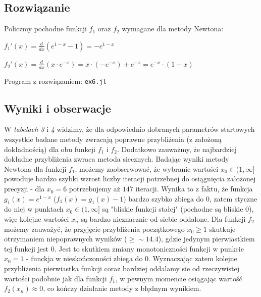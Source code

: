\documentclass[11pt]{article}
\begin{document}
    \subsection*{Rozwiązanie}
        Policzmy pochodne funkcji $f_1$ oraz $f_2$ wymagane dla metody Newtona:
        \begin{center}
        \begin{math}
            f_1'(x) = \frac{d}{dx}(e^{1 - x} - 1) = -e^{1 - x}
        \end{math}
        \end{center}
        \noindent
        \begin{center}
        \begin{math}
            f_2'(x) = \frac{d}{dx}(x \cdot e^{-x}) = x \cdot (-e^{-x}) + e^{-x} = e^{-x} \cdot (1 - x)
        \end{math}
        \end{center}
        \noindent\newline
        Program z rozwiązaniem: \texttt{ex6.jl}
        
    \subsection*{Wyniki i obserwacje}
        W \textit{tabelach 3} i  \textit{4} widzimy, że dla odpowiednio dobranych parametrów startowych wszystkie badane
        metody zwracają poprawne przybliżenia (z założoną dokładnością) dla obu funkcji $f_1$ i $f_2$. Dodatkowo zauważmy,
        że najbardziej dokładne przybliżenia zwraca metoda siecznych.
        \newline\newline
        Badając wyniki metody Newtona dla funkcji $f_1$, możemy zaobserwować, że wybranie wartości 
        $x_0 \in (1, \infty]$ powoduje bardzo szybki wzrost liczby iteracji potrzebnej do osiągnięcia
        założonej precyzji - dla $x_0 = 6$ potrzebujemy aż $147$ iteracji. Wynika to z faktu, że funkcja $g_1(x) = e^{1 - x}$ 
        ($f_1(x) = g_1(x) - 1$) bardzo szybko zbiega do $0$, zatem styczne do niej w punktach $x_0 \in (1, \infty]$ są 
        "bliskie funkcji stałej" (pochodne są bliskie $0$), więc kolejne wartości $x_n$ są bardzo nieznacznie od siebie oddalone.
        \newline
        Dla funkcji $f_2$ możemy zauważyć, że przyjęcie przybliżenia początkowego $x_0 \geq 1$ skutkuje otrzymaniem 
        niepoprawnych wyników ($\geq \sim 14.4$), gdzie jedynym pierwiastkiem tej funkcji jest $0$. Jest to skutkiem
        zmiany monotoniczności funkcji w punkcie $x_0 = 1$ - funckja w nieskończoności zbiega do $0$. Wyznaczając zatem
        kolejne przybliżenia pierwiastka funkcji coraz bardziej oddalamy sie od rzeczywistej wartości podobnie jak dla funkcji
        $f_1$, w pewnym momencie osiągając wartość $f_2(x_n) \approx 0$, co kończy działanie metody z błędnym wynikiem.
\end{document}
